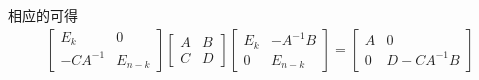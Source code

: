 \documentclass{article}
\begin{document}
相应的可得
\begin{align*}
  \begin{bmatrix}
    E_k            & 0 \\
    -C A^{-1} & E_{n - k}
  \end{bmatrix}
  \begin{bmatrix}
    A & B \\
    C & D
  \end{bmatrix}
  \begin{bmatrix}
    E_k & - A^{-1}B \\
    0   & E_{n - k}
  \end{bmatrix}
  = \begin{bmatrix}
      A & 0             \\
      0 & D - C A^{-1}B
    \end{bmatrix}
\end{align*}
\end{document}
